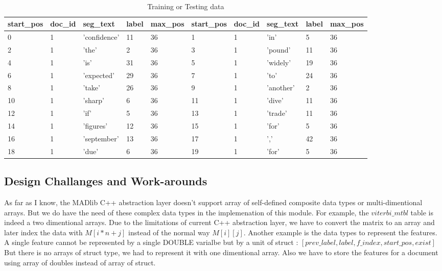 \begin {table}[h]
\caption {Training or Testing data} \label{tab:trainingdata} 
\begin{center}
    \footnotesize\tt
\begin{tabular}{lllll||lllll}
  start\_pos & doc\_id & seg\_text & label & max\_pos & start\_pos & doc\_id & seg\_text & label & max\_pos\\
  \hline                        
        0&1&'confidence'&11&36& 1&1&'in'&5&36\\ 
        2&1&'the'&2&36& 3&1&'pound'&11&36\\
        4&1&'is'&31&36& 5&1&'widely'&19&36\\ 
        6&1&'expected'&29&36& 7&1&'to'&24&36\\
        8&1&'take'&26&36& 9&1&'another'&2&36\\
        10&1&'sharp'&6&36& 11&1&'dive'&11&36\\
        12&1&'if'&5&36& 13&1&'trade'&11&36\\
        14&1&'figures'&12&36& 15&1&'for'&5&36\\
        16&1&'september'&13&36& 17&1&','&42&36\\ 
        18&1&'due'&6&36& 19&1&'for'&5&36\\\hline  
\end{tabular}
\end{center}
\end{table}

\subsection{Design Challanges and Work-arounds}
As far as I know, the MADlib C++ abstraction layer doesn't support array of self-defined composite data types or multi-dimentional arrays.
But we do have the need of these complex data types in the implemenation of this module. For example, the 
$viterbi\_mtbl$ table is indeed a two dimentional arrays. Due to the limitations of current C++ abstraction layer, we have to convert the matrix 
to an array and later index the data with  $M[i*n+j]$ instead of the normal way $M[i][j]$. Another example is the data types to represent the 
features. A single feature cannot be represented by a single DOUBLE varialbe but by a unit of struct : $[prev\_label, label, f\_index, start\_pos, exist]$  
But there is no arrays of struct type, we had to represent it with one dimentional array. 
Also we have to store the features for a document using  array of doubles instead of array of struct. 

